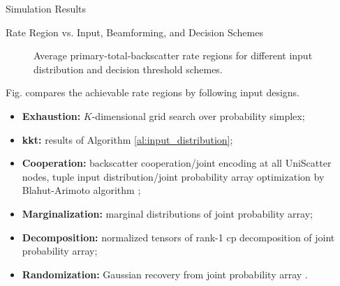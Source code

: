 \documentclass[journal]{IEEEtran}
\begin{document}
\begin{section}{Simulation Results}
	\begin{subsection}{Rate Region vs. Input, Beamforming, and Decision Schemes}
		\begin{figure}[!t]
			\centering
			\caption{Average primary-total-backscatter rate regions for different input distribution and decision threshold schemes.}
		\end{figure}
		Fig.  compares the achievable rate regions by following input designs.
		\begin{itemize}
			\item \textbf{Exhaustion:} $K$-dimensional grid search over probability simplex;
			\item \textbf{\gls{kkt}:} results of Algorithm \ref{al:input_distribution};
			\item \textbf{Cooperation:} backscatter cooperation/joint encoding at all UniScatter nodes, tuple input distribution/joint probability array optimization by Blahut-Arimoto algorithm \cite{Arimoto1972,Blahut1972a};
			\item \textbf{Marginalization:} marginal distributions of joint probability array;
			\item \textbf{Decomposition:} normalized tensors of rank-1 \gls{cp} decomposition of joint probability array;
			\item \textbf{Randomization:} Gaussian recovery from joint probability array \cite{Calvo2010}.
		\end{itemize}


\end{subsection}
\end{section}
\end{document}
